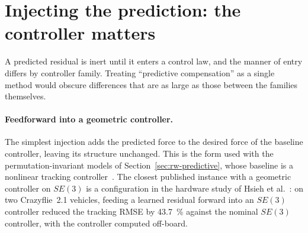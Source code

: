 \section{Injecting the prediction: the controller matters}
\label{sec:rw-inject}

A predicted residual is inert until it enters a control law, and the manner of entry differs by
controller family. Treating ``predictive compensation'' as a single method would obscure
differences that are as large as those between the families themselves.

\paragraph{Feedforward into a geometric controller.}
The simplest injection adds the predicted force to the desired force of the baseline controller,
leaving its structure unchanged. This is the form used with the permutation-invariant models of
Section~\ref{sec:rw-predictive}, whose baseline is a nonlinear tracking
controller~\cite{shi2020neuralswarm,shi2022neuralswarm2}. The closest published instance with a
geometric controller on $SE(3)$ is a configuration in the hardware study of Hsieh et
al.~\cite{hsieh2026flatness}: on two Crazyflie~2.1 vehicles, feeding a learned residual forward into
an $SE(3)$ controller reduced the tracking RMSE by \SI{43.7}{\percent} against the nominal $SE(3)$
controller, with the controller computed off-board.

